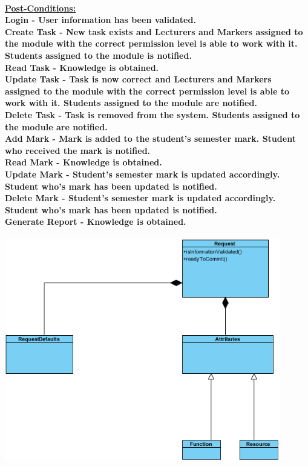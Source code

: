 \documentclass[12pt]{article}
\begin{document}
 \paragraph*{\underline{Post-Conditions:} \\ Login - User information has been validated.
 \\ Create Task - New task exists and Lecturers and Markers assigned to the module with the correct permission level is able to work with it. Students assigned to the module is notified.
 \\ Read Task - Knowledge is obtained.
 \\ Update Task - Task is now correct and Lecturers and Markers assigned to the module with the correct permission level is able to work with it. Students assigned to the module are notified.
 \\ Delete Task - Task is removed from the system. Students assigned to the module are notified.
 \\ Add Mark - Mark is added to the student's semester mark. Student who received the mark is notified.
 \\ Read Mark - Knowledge is obtained.
 \\ Update Mark - Student's semester mark is updated accordingly. Student who's mark has been updated is notified.
 \\ Delete Mark - Student's semester mark is updated accordingly. Student who's mark has been updated is notified.
 \\ Generate Report - Knowledge is obtained.}
 \begin{center}
  \includegraphics[width=120mm]{Diagram1.png}  
  \end{center}
\end{document}
